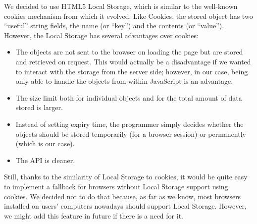 {%

We decided to use HTML5 Local Storage, which is similar to the well-known cookies mechanism from which it evolved.
Like Cookies, the stored object has two ``useful'' string fields, the name (or ``key'') and the contents (or ``value'').
However, the Local Storage has several advantages over cookies:

\begin{itemize}
\item The objects are not sent to the browser on loading the page but are stored and retrieved on request. This would actually be a disadvantage if we wanted to interact with the storage from the server side; however, in our case, being only able to handle the objects from within JavaScript is an advantage.
\item The size limit both for individual objects and for the total amount of data stored is larger.
\item Instead of setting expiry time, the programmer simply decides whether the objects should be stored temporarily (for a browser session) or permanently (which is our case).
\item The API is cleaner.
\end{itemize}

Still, thanks to the similarity of Local Storage to cookies, it would be quite easy to implement a fallback for browsers without Local Storage support using cookies. We decided not to do that because, as far as we know, most browsers installed on users' computers nowadays should support Local Storage. However, we might add this feature in future if there is a need for it.

}
